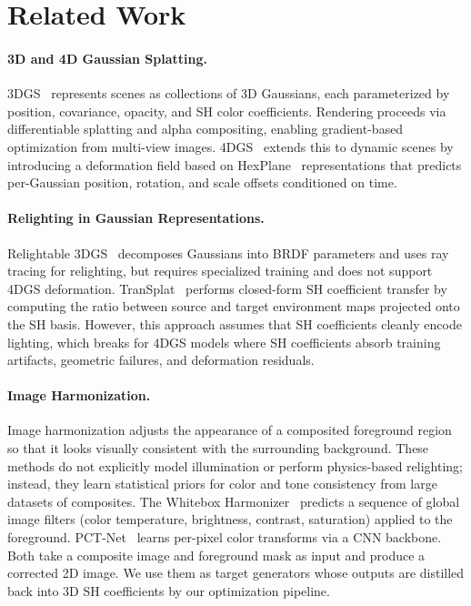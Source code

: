 \documentclass[10pt,twocolumn,letterpaper]{article}
\begin{document}
\section{Related Work}

\paragraph{3D and 4D Gaussian Splatting.}
3DGS~\cite{kerbl3Dgaussians} represents scenes as collections of 3D Gaussians, each parameterized by position, covariance, opacity, and SH color coefficients. Rendering proceeds via differentiable splatting and alpha compositing, enabling gradient-based optimization from multi-view images. 4DGS~\cite{wu20244dgaussiansplattingrealtime} extends this to dynamic scenes by introducing a deformation field based on HexPlane~\cite{fridovich2023kplanes} representations that predicts per-Gaussian position, rotation, and scale offsets conditioned on time.

\paragraph{Relighting in Gaussian Representations.}
Relightable 3DGS~\cite{gao2023relightable3dgaussian} decomposes Gaussians into BRDF parameters and uses ray tracing for relighting, but requires specialized training and does not support 4DGS deformation. TranSplat~\cite{chen2024transsplat} performs closed-form SH coefficient transfer by computing the ratio between source and target environment maps projected onto the SH basis. However, this approach assumes that SH coefficients cleanly encode lighting, which breaks for 4DGS models where SH coefficients absorb training artifacts, geometric failures, and deformation residuals.

\paragraph{Image Harmonization.}
Image harmonization adjusts the appearance of a composited foreground region so that it looks visually consistent with the surrounding background. These methods do not explicitly model illumination or perform physics-based relighting; instead, they learn statistical priors for color and tone consistency from large datasets of composites. The Whitebox Harmonizer~\cite{ke2022harmonizer} predicts a sequence of global image filters (color temperature, brightness, contrast, saturation) applied to the foreground. PCT-Net~\cite{guerreiro2023pctnet} learns per-pixel color transforms via a CNN backbone. Both take a composite image and foreground mask as input and produce a corrected 2D image. We use them as target generators whose outputs are distilled back into 3D SH coefficients by our optimization pipeline.
\end{document}
